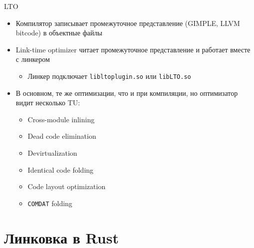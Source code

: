 \documentclass{beamer}
\begin{document}
\begin{frame}{LTO}
    \begin{itemize}
        \item Компилятор записывает промежуточное представление (GIMPLE, LLVM bitcode) в объектные
            файлы
        \item Link-time optimizer читает промежуточное представление и работает вместе с линкером
            \begin{itemize}
                \item Линкер подключает \texttt{liblto\textunderscore plugin.so} или
                    \texttt{libLTO.so}
            \end{itemize}
        \pause
        \item В основном, те же оптимизации, что и при компиляции, но оптимизатор видит несколько
            TU:
            \begin{itemize}
                \item Cross-module inlining
                \item Dead code elimination
                \item Devirtualization
                \item Identical code folding
                \item Code layout optimization
                \item \texttt{COMDAT} folding
            \end{itemize}
    \end{itemize}
\end{frame}

\section{Линковка в Rust}
\end{document}
